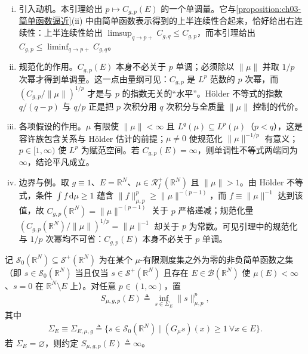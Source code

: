\documentclass[../../main.tex]{subfiles}%
\begin{document}
\begin{remark}\label{remark:ch03-规范单调}
\begin{enumerate}[(i)]
\item 引入动机。本引理给出 $p\mapsto C_{g,p}(E)$ 的一个单调量。它与\cref{proposition:ch03-简单函数逼近}(ii) 中由简单函数表示得到的上半连续性合起来，恰好给出右连续性：上半连续性给出 $\limsup_{q\to p+}C_{g,q}\leqslant C_{g,p}$，而本引理给出 $C_{g,p}\leqslant\liminf_{q\to p+}C_{g,q}$。

\item 规范化的作用。$C_{g,p}(E)$ 本身不必关于 $p$ 单调；必须除以 $\|\mu\|$ 并取 $1/p$ 次幂才得到单调量。这一点由量纲可见：$C_{g,p}$ 是 $L^p$ 范数的 $p$ 次幂，而 $(C_{g,p}/\|\mu\|)^{1/p}$ 才是与 $p$ 的指数无关的“水平”。Hölder 不等式的指数 $q/(q-p)$ 与 $q/p$ 正是把 $p$ 次积分用 $q$ 次积分与全质量 $\|\mu\|$ 控制的代价。

\item 各项假设的作用。$\mu$ 有限使 $\|\mu\|<\infty$ 且 $L^q(\mu)\subseteq L^p(\mu)$（$p<q$），这是容许族包含关系与 Hölder 估计的前提；$\mu\neq0$ 使规范化 $\|\mu\|^{-1/p}$ 有意义；$p\in[1,\infty)$ 使 $L^p$ 为赋范空间。若 $C_{g,p}(E)=\infty$，则单调性不等式两端同为 $\infty$，结论平凡成立。

\item 边界与例。取 $g\equiv1$、$E=\mathbb{R}^N$、$\mu\in\mathscr{R}^+_f(\mathbb{R}^N)$ 且 $\|\mu\|>1$。由 Hölder 不等式，条件 $\int f\,\mathrm{d}\mu\geqslant1$ 蕴含 $\|f\|_{\mu,p}^p\geqslant\|\mu\|^{-(p-1)}$，而 $f\equiv\|\mu\|^{-1}$ 达到该值，故 $C_{g,p}(\mathbb{R}^N)=\|\mu\|^{-(p-1)}$ 关于 $p$ 严格递减；规范化量 $\left(C_{g,p}(\mathbb{R}^N)/\|\mu\|\right)^{1/p}=\|\mu\|^{-1}$ 却关于 $p$ 为常数。可见引理中的规范化与 $1/p$ 次幂均不可省：$C_{g,p}(E)$ 本身不必关于 $p$ 单调。
\end{enumerate}
\end{remark}

记 $\mathscr S_0(\mathbb{R}^N)\subseteq\mathscr S^+(\mathbb{R}^N)$ 为在某个 $\mu$-有限测度集之外为零的非负简单函数之集（即 $s\in\mathscr S_0(\mathbb{R}^N)$ 当且仅当 $s\in\mathscr S^+(\mathbb{R}^N)$ 且存在 $E\in\mathcal{B}(\mathbb{R}^N)$ 使 $\mu(E)<\infty$、$s=0$ 在 $\mathbb{R}^N\setminus E$ 上）。对任意 $p\in(1,\infty)$，置
\begin{align}
S_{\mu,g,p}(E)\triangleq\inf_{s\in\Sigma_E}\|s\|_{\mu,p}^p,\label{align:ch03-3.33a}
\end{align}
其中
\begin{align}
\Sigma_E\equiv\Sigma_{E,\mu,g}\triangleq\{s\in\mathscr S_0(\mathbb{R}^N)\mid(G_\mu s)(x)\geqslant1\ \forall x\in E\}.\label{align:ch03-3.33b}
\end{align}
若 $\Sigma_E=\varnothing$，则约定 $S_{\mu,g,p}(E)\triangleq\infty$。
\end{document}
